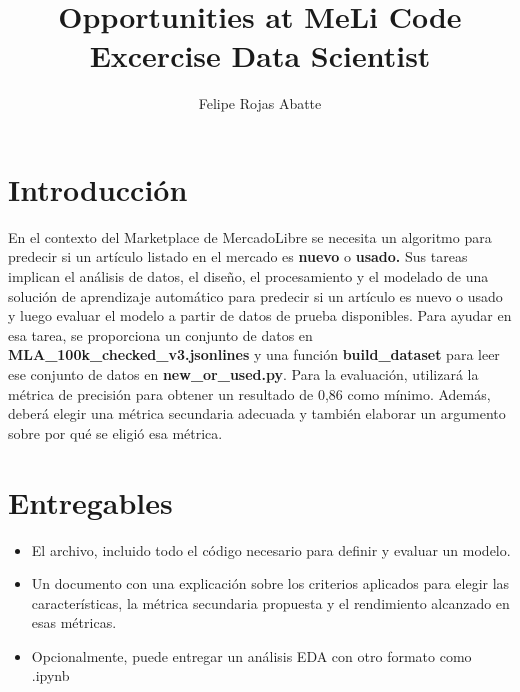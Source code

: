 \documentclass[a4paper,10pt]{article}
\title{\textbf{Opportunities at MeLi Code Excercise Data Scientist}}
\author{Felipe Rojas Abatte}
\begin{document}
\maketitle

\section*{Introducci\'on}
En el contexto del Marketplace de MercadoLibre se necesita un algoritmo para predecir si un artículo listado en el mercado es \textbf{nuevo} o \textbf{usado.}
Sus tareas implican el an\'alisis de datos, el dise\~no, el procesamiento y el modelado de una solución de aprendizaje automático para predecir si un artículo es nuevo o usado y luego evaluar el modelo a partir de datos de prueba disponibles.
Para ayudar en esa tarea, se proporciona un conjunto de datos en \textbf{MLA\_100k\_checked\_v3.jsonlines} y una función \textbf{build\_dataset} para leer ese conjunto de datos en \textbf{new\_or\_used.py}.
Para la evaluación, utilizará la métrica de precisión para obtener un resultado de 0,86 como mínimo. Además, deberá elegir una métrica secundaria adecuada y también elaborar un argumento sobre por qué se eligió esa métrica.

\section*{Entregables}

\begin{itemize}
\item El archivo, incluido todo el código necesario para definir y evaluar un modelo.
\item Un documento con una explicación sobre los criterios aplicados para elegir las características, la métrica secundaria propuesta y el rendimiento alcanzado en esas métricas. 
\item Opcionalmente, puede entregar un análisis EDA con otro formato como .ipynb
\end{itemize}

\newpage
\end{document}
